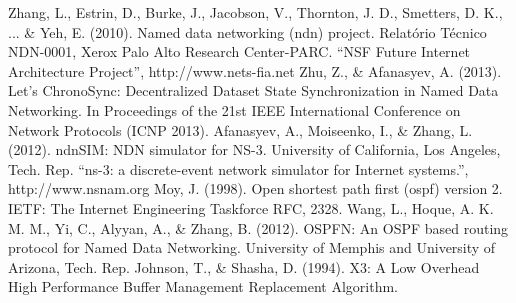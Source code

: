 \documentclass[conference]{IEEEtran}
\begin{document}






%
%
%
\begin{thebibliography}{1}

	Zhang, L., Estrin, D., Burke, J., Jacobson, V., Thornton, J. D., Smetters, D. K., ... \& Yeh, E. (2010). Named data networking (ndn) project. Relatório Técnico NDN-0001, Xerox Palo Alto Research Center-PARC.
	``NSF Future Internet Architecture Project'', http://www.nets-fia.net
	Zhu, Z., \& Afanasyev, A. (2013). Let’s ChronoSync: Decentralized Dataset State Synchronization in Named Data Networking. In Proceedings of the 21st IEEE International Conference on Network Protocols (ICNP 2013).
	Afanasyev, A., Moiseenko, I., \& Zhang, L. (2012). ndnSIM: NDN simulator for NS-3. University of California, Los Angeles, Tech. Rep.
	``ns-3: a discrete-event network simulator for Internet systems.'', http://www.nsnam.org
	Moy, J. (1998). Open shortest path first (ospf) version 2. IETF: The Internet Engineering Taskforce RFC, 2328.
	Wang, L., Hoque, A. K. M. M., Yi, C., Alyyan, A., \& Zhang, B. (2012). OSPFN: An OSPF based routing protocol for Named Data Networking. University of Memphis and University of Arizona, Tech. Rep.
	Johnson, T., \& Shasha, D. (1994). X3: A Low Overhead High Performance Buffer Management Replacement Algorithm.


\end{thebibliography}


\end{document}
